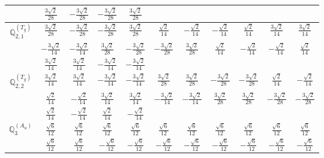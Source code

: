 \documentclass[fleqn,10pt,landscape]{article}
\begin{document}
\begin{itemize}
{\begin{center}
\begin{longtable}{ccccccccccc}
& $ \frac{3 \sqrt{2}}{28} $ & $ - \frac{3 \sqrt{2}}{28} $ & $ - \frac{3 \sqrt{2}}{28} $ & $ \frac{3 \sqrt{2}}{28} $ & $  $ & $  $ & $  $ & $  $ & $  $ & $  $ \\ \hline
$\mathbb{Q}_{2,1}^{(T_{g})}$ & $ \frac{3 \sqrt{2}}{28} $ & $ - \frac{3 \sqrt{2}}{28} $ & $ - \frac{3 \sqrt{2}}{28} $ & $ \frac{3 \sqrt{2}}{28} $ & $ \frac{\sqrt{2}}{14} $ & $ - \frac{\sqrt{2}}{14} $ & $ - \frac{\sqrt{2}}{14} $ & $ \frac{\sqrt{2}}{14} $ & $ \frac{3 \sqrt{2}}{14} $ & $ \frac{3 \sqrt{2}}{14} $ \\
& $ - \frac{3 \sqrt{2}}{14} $ & $ - \frac{3 \sqrt{2}}{14} $ & $ \frac{3 \sqrt{2}}{28} $ & $ - \frac{3 \sqrt{2}}{28} $ & $ - \frac{3 \sqrt{2}}{28} $ & $ \frac{3 \sqrt{2}}{28} $ & $ \frac{\sqrt{2}}{14} $ & $ - \frac{\sqrt{2}}{14} $ & $ - \frac{\sqrt{2}}{14} $ & $ \frac{\sqrt{2}}{14} $ \\
& $ \frac{3 \sqrt{2}}{14} $ & $ \frac{3 \sqrt{2}}{14} $ & $ - \frac{3 \sqrt{2}}{14} $ & $ - \frac{3 \sqrt{2}}{14} $ & $  $ & $  $ & $  $ & $  $ & $  $ & $  $ \\ \hline
$\mathbb{Q}_{2,2}^{(T_{g})}$ & $ \frac{3 \sqrt{2}}{14} $ & $ \frac{3 \sqrt{2}}{14} $ & $ - \frac{3 \sqrt{2}}{14} $ & $ - \frac{3 \sqrt{2}}{14} $ & $ \frac{3 \sqrt{2}}{28} $ & $ \frac{3 \sqrt{2}}{28} $ & $ - \frac{3 \sqrt{2}}{28} $ & $ - \frac{3 \sqrt{2}}{28} $ & $ \frac{\sqrt{2}}{14} $ & $ - \frac{\sqrt{2}}{14} $ \\
& $ \frac{\sqrt{2}}{14} $ & $ - \frac{\sqrt{2}}{14} $ & $ \frac{3 \sqrt{2}}{14} $ & $ \frac{3 \sqrt{2}}{14} $ & $ - \frac{3 \sqrt{2}}{14} $ & $ - \frac{3 \sqrt{2}}{14} $ & $ \frac{3 \sqrt{2}}{28} $ & $ \frac{3 \sqrt{2}}{28} $ & $ - \frac{3 \sqrt{2}}{28} $ & $ - \frac{3 \sqrt{2}}{28} $ \\
& $ \frac{\sqrt{2}}{14} $ & $ - \frac{\sqrt{2}}{14} $ & $ \frac{\sqrt{2}}{14} $ & $ - \frac{\sqrt{2}}{14} $ & $  $ & $  $ & $  $ & $  $ & $  $ & $  $ \\ \hline
$\mathbb{Q}_{3}^{(A_{u})}$ & $ \frac{\sqrt{6}}{12} $ & $ \frac{\sqrt{6}}{12} $ & $ \frac{\sqrt{6}}{12} $ & $ \frac{\sqrt{6}}{12} $ & $ \frac{\sqrt{6}}{12} $ & $ \frac{\sqrt{6}}{12} $ & $ \frac{\sqrt{6}}{12} $ & $ \frac{\sqrt{6}}{12} $ & $ \frac{\sqrt{6}}{12} $ & $ \frac{\sqrt{6}}{12} $ \\
& $ \frac{\sqrt{6}}{12} $ & $ \frac{\sqrt{6}}{12} $ & $ - \frac{\sqrt{6}}{12} $ & $ - \frac{\sqrt{6}}{12} $ & $ - \frac{\sqrt{6}}{12} $ & $ - \frac{\sqrt{6}}{12} $ & $ - \frac{\sqrt{6}}{12} $ & $ - \frac{\sqrt{6}}{12} $ & $ - \frac{\sqrt{6}}{12} $ & $ - \frac{\sqrt{6}}{12} $ \\

\end{longtable}
\end{center}}
\end{itemize}
\end{document}
